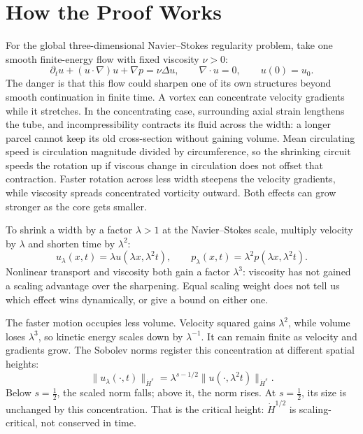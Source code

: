 \begingroup
\setlength{\parindent}{0pt}
\setlength{\parskip}{0.40\baselineskip}
\setlength{\abovedisplayskip}{6.5pt plus 1.5pt minus 1.5pt}
\setlength{\belowdisplayskip}{6.5pt plus 1.5pt minus 1.5pt}
\setlength{\jot}{4.5pt}

\section*{How the Proof Works}

For the global three-dimensional Navier--Stokes regularity problem, take one
smooth finite-energy flow with fixed viscosity \(\nu>0\):
\[
 \partial_tu+(u\!\cdot\nabla)u+\nabla p=\nu\Delta u,
 \qquad \nabla\!\cdot u=0,
 \qquad u(0)=u_0.
\]
The danger is that this flow could sharpen one of its own structures beyond
smooth continuation in finite time.  A vortex can concentrate velocity
gradients while it stretches.  In the concentrating case, surrounding axial
strain lengthens the tube, and incompressibility contracts its fluid across
the width: a longer parcel cannot keep its old cross-section without gaining
volume.  Mean circulating speed is circulation magnitude divided by
circumference, so the shrinking circuit speeds the rotation up if viscous
change in circulation does not offset that contraction.  Faster rotation
across less width steepens the velocity gradients, while viscosity spreads
concentrated vorticity outward.  Both effects can grow stronger as the core
gets smaller.

To shrink a width by a factor \(\lambda>1\) at the Navier--Stokes scale,
multiply velocity by \(\lambda\) and shorten time by \(\lambda^2\):
\[
 u_\lambda(x,t)=\lambda u(\lambda x,\lambda^2t),
 \qquad
 p_\lambda(x,t)=\lambda^2p(\lambda x,\lambda^2t).
\]
Nonlinear transport and viscosity both gain a factor \(\lambda^3\): viscosity
has not gained a scaling advantage over the sharpening.  Equal scaling weight
does not tell us which effect wins dynamically, or give a bound on either one.

The faster motion occupies less volume.  Velocity squared gains
\(\lambda^2\), while volume loses \(\lambda^3\), so kinetic energy scales down
by \(\lambda^{-1}\).  It can remain finite as velocity and gradients grow.
The Sobolev norms register this concentration at different spatial heights:
\[
 \|u_\lambda(\cdot,t)\|_{\dot H^s}
 =\lambda^{s-1/2}
  \|u(\cdot,\lambda^2t)\|_{\dot H^s}.
\]
Below \(s=\tfrac12\), the scaled norm falls; above it, the norm rises.  At
\(s=\tfrac12\), its size is unchanged by this concentration.  That is the
critical height: \(\dot H^{1/2}\) is scaling-critical, not conserved in time.

